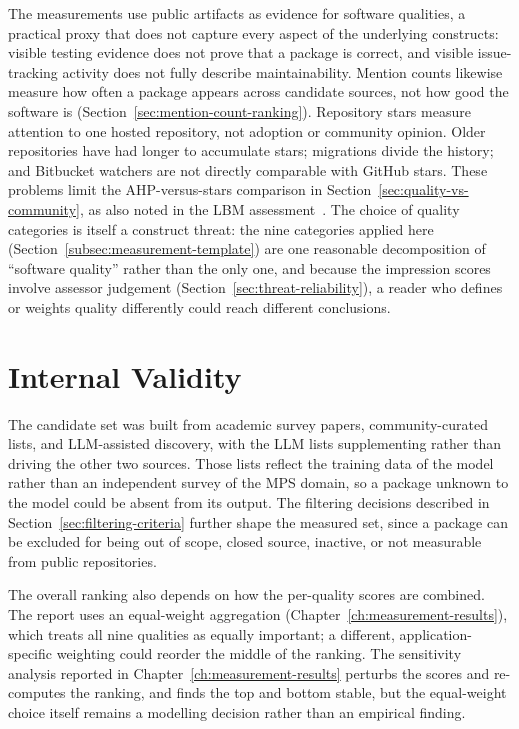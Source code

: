 The measurements use public artifacts as evidence for software qualities, a practical proxy that does not capture every aspect of the underlying constructs: visible testing evidence does not prove that a package is correct, and visible issue-tracking activity does not fully describe maintainability. Mention counts likewise measure how often a package appears across candidate sources, not how good the software is (Section~\ref{sec:mention-count-ranking}). Repository stars measure attention to one hosted repository, not adoption or community opinion. Older repositories have had longer to accumulate stars; migrations divide the history; and Bitbucket watchers are not directly comparable with GitHub stars. These problems limit the AHP-versus-stars comparison in Section~\ref{sec:quality-vs-community}, as also noted in the LBM assessment~\citep{Smith2024LBM}. The choice of quality categories is itself a construct threat: the nine categories applied here (Section~\ref{subsec:measurement-template}) are one reasonable decomposition of ``software quality'' rather than the only one, and because the impression scores involve assessor judgement (Section~\ref{sec:threat-reliability}), a reader who defines or weights quality differently could reach different conclusions.

\section{Internal Validity}
\label{sec:threat-internal-validity}

The candidate set was built from academic survey papers, community-curated lists, and LLM-assisted discovery, with the LLM lists supplementing rather than driving the other two sources. Those lists reflect the training data of the model rather than an independent survey of the MPS domain, so a package unknown to the model could be absent from its output. The filtering decisions described in Section~\ref{sec:filtering-criteria} further shape the measured set, since a package can be excluded for being out of scope, closed source, inactive, or not measurable from public repositories.

The overall ranking also depends on how the per-quality scores are combined. The report uses an equal-weight aggregation (Chapter~\ref{ch:measurement-results}), which treats all nine qualities as equally important; a different, application-specific weighting could reorder the middle of the ranking. The sensitivity analysis reported in Chapter~\ref{ch:measurement-results} perturbs the scores and re-computes the ranking, and finds the top and bottom stable, but the equal-weight choice itself remains a modelling decision rather than an empirical finding.

